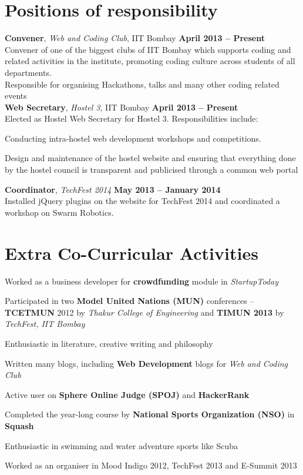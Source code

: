 \documentclass[margin,11pt]{resume}
\begin{document}
\begin{resume}
\section{\mysidestyle Positions of responsibility}
\textbf{Convener}, \textsl{Web and Coding Club}, IIT Bombay \hfill \textbf{April 2013 -- Present}\\
Convener of one of the biggest clubs of IIT Bombay which supports coding and related activities in the institute, promoting coding culture across students of all departments. \\ Responsible for organising Hackathons, talks and many other coding related events
\vspace{2mm}\\
\textbf{Web Secretary}, \textsl{Hostel 3}, IIT Bombay \hfill \textbf{April 2013 -- Present}\\
Elected as Hostel Web Secretary for Hostel 3. Responsibilities include:
\begin{list2}
\item Conducting intra-hostel web development workshops and competitions.
\item Design and maintenance of the hostel website and ensuring that everything done by the hostel council is transparent and publicised through a common web portal
\end{list2}
\vspace{-3mm}
\textbf{Coordinator}, \textsl{TechFest 2014} \hfill \textbf{May 2013 -- January 2014}\\
Installed jQuery plugins on the website for TechFest 2014 and coordinated a workshop on Swarm Robotics.

\section{\mysidestyle Extra Co-Curricular Activities}
\begin{list2}
\item Worked as a business developer for \textbf{crowdfunding} module in \textsl{StartupToday}
\item Participated in two \textbf{Model United Nations (MUN)} conferences -- \textbf{TCETMUN} 2012 by \textsl{Thakur College of Engineering} and \textbf{TIMUN 2013} by \textsl{TechFest, IIT Bombay}
\item Enthusiastic in literature, creative writing and philosophy
\item Written many blogs, including \textbf{Web Development} blogs for \textsl{Web and Coding Club}
\item Active user on \textbf{Sphere Online Judge (SPOJ)} and \textbf{HackerRank}
\item Completed the year-long course by \textbf{National Sports Organization (NSO)} in \textbf{Squash}
\item Enthusiastic in swimming and water adventure sports like Scuba
\item Worked as an organiser in Mood Indigo 2012, TechFest 2013 and E-Summit 2013
\end{list2}




\end{resume}
\end{document}
